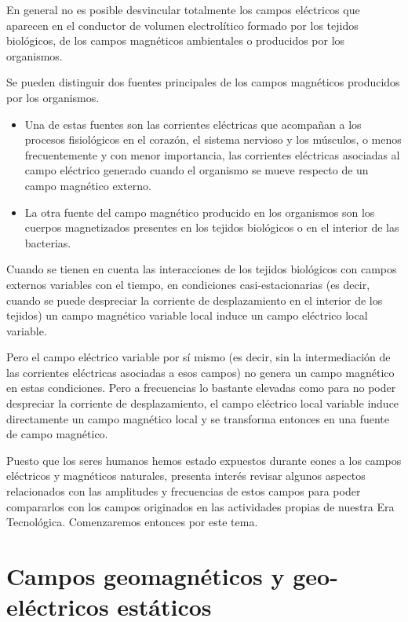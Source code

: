 En general no es posible desvincular totalmente los campos eléctricos que aparecen en el conductor de volumen electrolítico formado por los tejidos biológicos, de los campos magnéticos ambientales o producidos por los organismos.

Se pueden distinguir dos fuentes principales de los campos magnéticos producidos por los organismos.

\begin{itemize}
	\item Una de estas fuentes son las corrientes eléctricas que acompañan a los procesos fisiológicos en el corazón, el sistema nervioso y los músculos, o menos frecuentemente y con menor importancia, las corrientes eléctricas asociadas al campo eléctrico generado cuando el organismo se mueve respecto de un campo magnético externo.
	
	\item La otra fuente del campo magnético producido en los organismos son los cuerpos magnetizados presentes en los tejidos biológicos o en el interior de las bacterias.
\end{itemize}

Cuando se tienen en cuenta las interacciones de los tejidos biológicos con campos externos variables con el tiempo, en condiciones casi-estacionarias (es decir, cuando se puede despreciar la corriente de desplazamiento en el interior de los tejidos) un campo magnético variable local induce un campo eléctrico local variable.

Pero el campo eléctrico variable por sí mismo (es decir, sin la intermediación de las corrientes eléctricas asociadas a esos campos) no genera un campo magnético en estas condiciones.
Pero a frecuencias lo bastante elevadas como para no poder despreciar la corriente de desplazamiento, el campo eléctrico local variable induce directamente un campo magnético local y se transforma entonces en una fuente de campo magnético.

Puesto que los seres humanos hemos estado expuestos durante eones a los campos eléctricos y magnéticos naturales, presenta interés revisar algunos aspectos relacionados con las amplitudes y frecuencias de estos campos para poder compararlos con los campos originados en las actividades propias de nuestra Era Tecnológica. Comenzaremos entonces por este tema.

\section{Campos geomagnéticos y geo-eléctricos estáticos}


